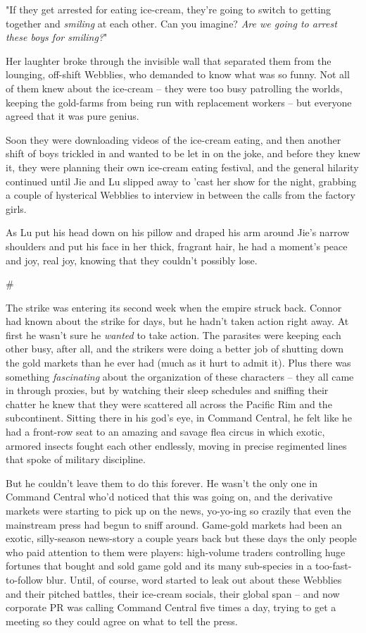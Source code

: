 "If they get arrested for eating ice-cream, they're going to switch
to getting together and \emph{smiling} at each other. Can you
imagine? \emph{Are we going to arrest these boys for smiling?}"

Her laughter broke through the invisible wall that separated them
from the lounging, off-shift Webblies, who demanded to know what
was so funny. Not all of them knew about the ice-cream -- they were
too busy patrolling the worlds, keeping the gold-farms from being
run with replacement workers -- but everyone agreed that it was
pure genius.

Soon they were downloading videos of the ice-cream eating, and then
another shift of boys trickled in and wanted to be let in on the
joke, and before they knew it, they were planning their own
ice-cream eating festival, and the general hilarity continued until
Jie and Lu slipped away to 'cast her show for the night, grabbing a
couple of hysterical Webblies to interview in between the calls
from the factory girls.

As Lu put his head down on his pillow and draped his arm around
Jie's narrow shoulders and put his face in her thick, fragrant
hair, he had a moment's peace and joy, real joy, knowing that they
couldn't possibly lose.

\#

The strike was entering its second week when the empire struck
back. Connor had known about the strike for days, but he hadn't
taken action right away. At first he wasn't sure he \emph{wanted}
to take action. The parasites were keeping each other busy, after
all, and the strikers were doing a better job of shutting down the
gold markets than he ever had (much as it hurt to admit it). Plus
there was something \emph{fascinating} about the organization of
these characters -- they all came in through proxies, but by
watching their sleep schedules and sniffing their chatter he knew
that they were scattered all across the Pacific Rim and the
subcontinent. Sitting there in his god's eye, in Command Central,
he felt like he had a front-row seat to an amazing and savage flea
circus in which exotic, armored insects fought each other
endlessly, moving in precise regimented lines that spoke of
military discipline.

But he couldn't leave them to do this forever. He wasn't the only
one in Command Central who'd noticed that this was going on, and
the derivative markets were starting to pick up on the news,
yo-yo-ing so crazily that even the mainstream press had begun to
sniff around. Game-gold markets had been an exotic, silly-season
news-story a couple years back but these days the only people who
paid attention to them were players: high-volume traders
controlling huge fortunes that bought and sold game gold and its
many sub-species in a too-fast-to-follow blur. Until, of course,
word started to leak out about these Webblies and their pitched
battles, their ice-cream socials, their global span -- and now
corporate PR was calling Command Central five times a day, trying
to get a meeting so they could agree on what to tell the press.

